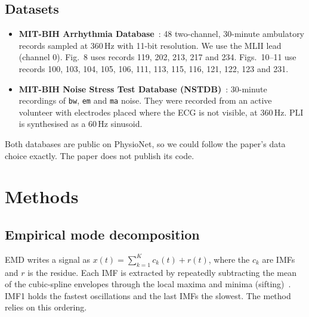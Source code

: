 \documentclass[11pt,a4paper]{article}
\begin{document}
\subsection{Datasets}
\begin{itemize}
  \item \textbf{MIT-BIH Arrhythmia Database}~\cite{moody_mit,physionet}: 48 two-channel, 30-minute ambulatory
        records sampled at 360\,Hz with 11-bit resolution. We use the MLII lead (channel 0). Fig.~8 uses records
        119, 202, 213, 217 and 234. Figs.~10--11 use records 100, 103, 104, 105, 106, 111, 113, 115, 116, 121, 122, 123
        and 231.
  \item \textbf{MIT-BIH Noise Stress Test Database (NSTDB)}~\cite{moody_nst}: 30-minute recordings of \texttt{bw},
        \texttt{em} and \texttt{ma} noise. They were recorded from an active volunteer with electrodes placed where
        the ECG is not visible, at 360\,Hz. PLI is synthesised as a 60\,Hz sinusoid.
\end{itemize}
Both databases are public on PhysioNet, so we could follow the paper's data choice exactly. The paper does not
publish its code.

\section{Methods}

\subsection{Empirical mode decomposition}
EMD writes a signal as $x(t)=\sum_{k=1}^{K} c_k(t) + r(t)$, where the $c_k$ are IMFs and $r$ is the residue. Each
IMF is extracted by repeatedly subtracting the mean of the cubic-spline envelopes through the local maxima and
minima (sifting)~\cite{huang}. IMF1 holds the fastest oscillations and the last IMFs the slowest. The method relies on
this ordering.
\end{document}
